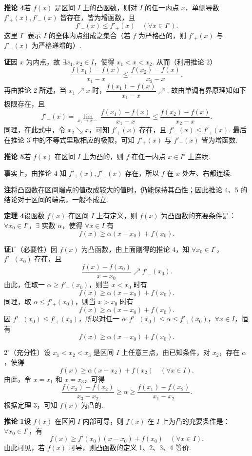 \documentclass[UTF8,12pt,a4paper,fontset=fandol]{ctexart}
\begin{document}
\noindent\textbf{推论 4}\quad 若 $f(x)$ 是区间 $I$ 上的凸函数，则对 $I$ 的任一内点 $x$，单侧导数 $f'_+(x),f'_-(x)$ 皆存在，皆为增函数，且
\[
  f'_-(x)\le f'_+(x)\quad(\forall x\in I^\circ).
\]
这里 $I^\circ$ 表示 $I$ 的全体内点组成之集合（若 $f$ 为严格凸的，则 $f'_+(x)$ 与 $f'_-(x)$ 为严格递增的）.

\noindent\textbf{证}\quad 因 $x$ 为内点，故 $\exists x_1,x_2\in I$，使得 $x_1<x<x_2$. 从而（利用推论 2）
\[
  \frac{f(x_1)-f(x)}{x_1-x}
  \le\frac{f(x_2)-f(x)}{x_2-x}.
\]
再由推论 2 所述，当 $x_1\nearrow x$ 时，$\dfrac{f(x_1)-f(x)}{x_1-x}\nearrow$. 故由单调有界原理知如下极限存在，且
\[
  f'_-(x)=\lim_{x_1\to x-}\frac{f(x_1)-f(x)}{x_1-x}
  \le\frac{f(x_2)-f(x)}{x_2-x}.
\]
同理，在此式中，令 $x_2\searrow x$，可知 $f'_+(x)$ 存在，且 $f'_-(x)\le f'_+(x)$. 最后在推论 3 中的不等式里取相应的极限，可知 $f'_+(x)$ 与 $f'_-(x)$ 皆为增函数.

\noindent\textbf{推论 5}\quad 若 $f(x)$ 在区间 $I$ 上为凸的，则 $f$ 在任一内点 $x\in I^\circ$ 上连续.

事实上，由推论 4 知 $f'_+(x),f'_-(x)$ 存在，所以 $f$ 在 $x$ 处左、右都连续.

\noindent\textbf{注}\quad 将凸函数在区间端点的值改成较大的值时，仍能保持其凸性；因此推论 4、5 的结论对于区间的端点，一般不成立.

\noindent\textbf{定理 4}\quad 设函数 $f(x)$ 在区间 $I$ 上有定义，则 $f(x)$ 为凸函数的充要条件是：$\forall x_0\in I^\circ$，$\exists$ 实数 $\alpha$，使得 $\forall x\in I$ 有
\[
  f(x)\ge \alpha(x-x_0)+f(x_0).
\]

\noindent\textbf{证}\quad $1^\circ$（必要性）因 $f(x)$ 为凸函数，由上面刚得的推论 4，知 $\forall x_0\in I^\circ$，$f'_-(x_0)$ 存在，且
\[
  \frac{f(x)-f(x_0)}{x-x_0}\nearrow f'_-(x_0).
\]
由此，任取一 $\alpha\ge f'_-(x_0)$，则当 $x<x_0$ 时有
\[
  f(x)\ge \alpha(x-x_0)+f(x_0).
\]
同理，取 $\alpha\le f'_+(x_0)$，则当 $x>x_0$ 时有
\[
  f(x)\ge \alpha(x-x_0)+f(x_0).
\]
因 $f'_-(x_0)\le f'_+(x_0)$，所以对任一 $\alpha:f'_-(x_0)\le\alpha\le f'_+(x_0)$，$\forall x\in I$，恒有
\[
  f(x)\ge \alpha(x-x_0)+f(x_0).
\]

$2^\circ$（充分性）设 $x_1<x_2<x_3$ 是区间 $I$ 上任意三点，由已知条件，对 $x_2$，存在 $\alpha$，使得
\[
  f(x)\ge \alpha(x-x_2)+f(x_2)\quad(\forall x\in I).
\]
由此，令 $x=x_1$ 和 $x=x_3$，可得
\[
  \frac{f(x_3)-f(x_2)}{x_3-x_2}\ge \alpha\ge \frac{f(x_1)-f(x_2)}{x_1-x_2}.
\]
根据定理 3，可知 $f(x)$ 为凸的.

\noindent\textbf{推论 1}\quad 设 $f(x)$ 在区间 $I$ 内部可导，则 $f(x)$ 在 $I$ 上为凸的充要条件是：$\forall x_0\in I^\circ$，有
\[
  f(x)\ge f'(x_0)(x-x_0)+f(x_0)\quad(\forall x\in I).
\]
由此可见，若 $f(x)$ 可导，则凸函数的定义 1、2、3、4 等价.
\end{document}

